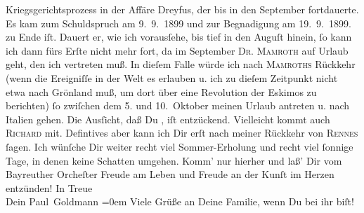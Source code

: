 \begin{ledgroupsized}[t]{13cm}
{{{                  Kriegsgerichtsprozess in der Affäre Dreyfus,
                  der bis in den September fortdauerte. Es kam zum
                  Schuldspruch am 9. 9. 1899 und zur Begnadigung am
                     19. 9. 1899.}}}\label{K_L02881-4h} zu Ende iſt. Dauert er, wie
               ich vorausſehe, bis tief in den Auguſt hinein, ſo kann
               ich dann fürs Erſte nicht mehr fort, da  im September{ }\textsc{Dr. Mamroth} auf Urlaub geht, den ich vertreten muß. In dieſem Falle würde ich nach \textsc{Mamroths} Rückkehr (wenn die Ereigniſſe
               in der Welt es erlauben u. ich zu dieſem Zeitpunkt nicht etwa nach Grönland muß, um dort über eine Revolution der Eskimos zu
               berichten) ſo zwiſchen dem 5. und 10. Oktober
               meinen Urlaub {\pb}antreten u. nach Italien gehen. Die Ausſicht, daß Du \label{K_L02881-5v}\label{K_L02881-5h}, iſt entzückend. Vielleicht kommt auch \textsc{Richard} mit. Defintives aber kann ich Dir erſt nach meiner Rückkehr von \textsc{Rennes} ſagen.\pend
           \pstart
           Ich wünſche Dir weiter recht viel Sommer-Erholung und recht viel ſonnige Tage, in
               denen keine Schatten umgehen. Komm’ nur hierher und laß’ Dir vom Bayreuther Orcheſter Freude am Leben und
               Freude an der Kunſt  im Herzen entzünden!\pend
           \pstart
           In Treue {\\[\baselineskip]}Dein \spacefill\mbox{Paul Goldmann}\pend
           \leftskip=0em{}\pstart
           \noindent{}{\pb}Viele Grüße an Deine Familie, wenn Du bei ihr
                  biſt!\pend
           
         
         \endnumbering{}\end{ledgroupsized}  \newcommand{\dateiname}{L02881}\newcommand{\titel}{Paul Goldmann an Arthur Schnitzler, 27. 7. [1899]}\newcommand{\editorInnen}{Martin Anton Müller und Laura Untner}
      